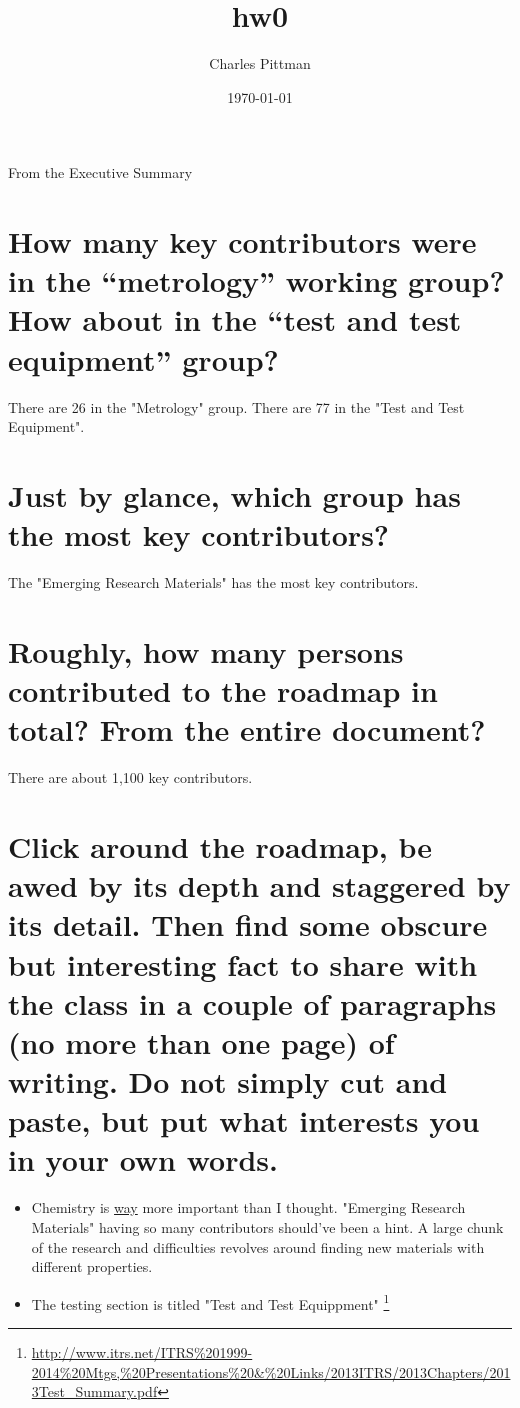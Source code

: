 \documentclass[11pt]{article}
\author{Charles Pittman}
\date{\today}
\title{hw0}
\begin{document}
\maketitle
\tableofcontents

From the Executive Summary

\section{How many key contributors were in the “metrology” working group?  How about in the “test and test equipment” group?}
\label{sec-1}
There are 26 in the "Metrology" group. There are 77 in the "Test and Test
Equipment".

\section{Just by glance, which group has the most key contributors?}
\label{sec-2}
The "Emerging Research Materials" has the most key contributors.

\section{Roughly, how many persons contributed to the roadmap in total?  From the entire document?}
\label{sec-3}
There are about 1,100 key contributors.

\section{Click around the roadmap, be awed by its depth and staggered by its detail. Then find some obscure but interesting fact to share with the class in a couple of paragraphs (no more than one page) of writing. Do not simply cut and paste, but put what interests you in your own words.}
\label{sec-4}
\begin{itemize}
\item Chemistry is \uline{way} more important than I thought.  "Emerging Research Materials" having so many contributors should've been a hint.  A large chunk of the research and difficulties revolves around finding new materials with different properties.
\item The testing section is titled "Test and Test Equippment" \footnote{\url{http://www.itrs.net/ITRS\%201999-2014\%20Mtgs,\%20Presentations\%20&\%20Links/2013ITRS/2013Chapters/2013Test_Summary.pdf}}
\end{itemize}
\end{document}
